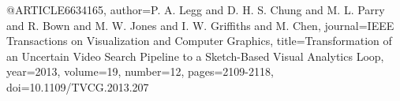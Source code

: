 @ARTICLE{6634165,
  author={P. A. {Legg} and D. H. S. {Chung} and M. L. {Parry} and R. {Bown} and M. W. {Jones} and I. W. {Griffiths} and M. {Chen}},
  journal={IEEE Transactions on Visualization and Computer Graphics}, 
  title={Transformation of an Uncertain Video Search Pipeline to a Sketch-Based Visual Analytics Loop}, 
  year={2013},
  volume={19},
  number={12},
  pages={2109-2118},
  doi={10.1109/TVCG.2013.207}}